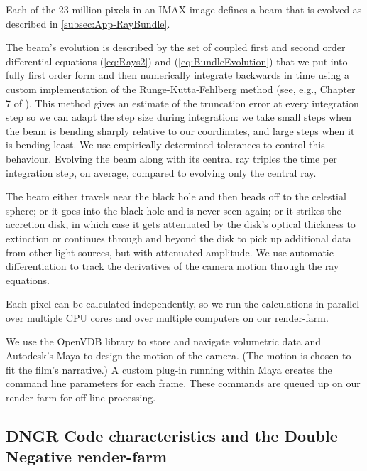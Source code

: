 \documentclass[12pt]{iopart}
\begin{document}
Each of the 23 million pixels in an IMAX image defines a beam that is evolved as described in \ref{subsec:App-RayBundle}.

The beam's evolution is described by the set of 
coupled first and second order differential equations (\ref{eq:Rays2}) and
(\ref{eq:BundleEvolution}) that we put into fully first order
form and then numerically integrate  backwards in time using a custom implementation of the Runge-Kutta-Fehlberg method (see, e.g., Chapter 7 of \cite{RKF}).  This method gives an estimate of the truncation error at every integration step so we can adapt the step size during integration: we take small steps when the beam is bending sharply relative to our coordinates, and large steps when it is bending least. We use empirically determined tolerances to control this behaviour. 
Evolving the beam along with its central ray triples the time per integration step, on average,
compared to evolving only the central ray.


The beam either travels near the black hole and then heads off to the celestial sphere; or it goes into the black hole and is never seen again; or it strikes the accretion disk, in which case it gets attenuated by the disk's optical thickness  to extinction or continues through and  beyond the disk to pick up additional data from other light sources, but with attenuated amplitude. 
We use automatic differentiation \cite{Piponi}  to track the derivatives of the camera motion
through the ray equations.

Each pixel  can be calculated independently, so we run the calculations in parallel over multiple CPU cores and over multiple computers on our render-farm.

We use the OpenVDB library \cite{OPENVDB} to store and navigate volumetric data and Autodesk's Maya \cite{MAYA} to design the motion of the camera. (The motion is chosen to fit the film's narrative.)  A custom plug-in running within Maya creates the command line parameters for each frame. These commands are queued up on our render-farm for off-line processing.



\subsection{DNGR Code characteristics and the Double Negative render-farm}
\label{subsec:App-CodeFarm}
\end{document}
